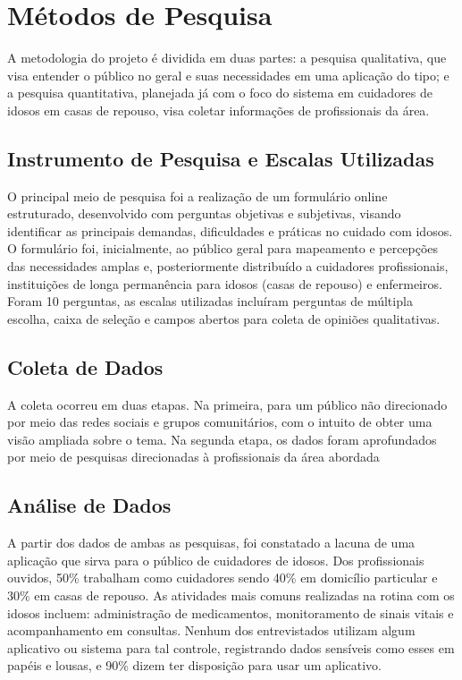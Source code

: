 \documentclass[
	article,			%
	12pt,				%
	oneside,			%
	a4paper,			%
    BIBLATEX,           %
	english,			%
	brazil,				%
	sumario=tradicional
	]{abntex2}
\begin{document}
\section{Métodos de Pesquisa}

A metodologia do projeto é dividida em duas partes: a pesquisa qualitativa, que visa entender o público no geral e suas necessidades em uma aplicação do tipo; e a pesquisa quantitativa, planejada já com o foco do sistema em cuidadores de idosos em casas de repouso, visa coletar informações de profissionais da área. 


\subsection{Instrumento de Pesquisa e Escalas Utilizadas}

O principal meio de pesquisa foi a realização de um formulário online estruturado, desenvolvido com perguntas objetivas e subjetivas, visando identificar as principais demandas, dificuldades e práticas no cuidado com idosos. O formulário foi, inicialmente, ao público geral para mapeamento e percepções das necessidades amplas e, posteriormente distribuído a cuidadores profissionais, instituições de longa permanência para idosos (casas de repouso) e enfermeiros. Foram 10 perguntas, as escalas utilizadas incluíram perguntas de múltipla escolha, caixa de seleção e campos abertos para coleta de opiniões qualitativas. 

\subsection{Coleta de Dados}

A coleta ocorreu em duas etapas. Na primeira, para um público não direcionado por meio das redes sociais e grupos comunitários, com o intuito de obter uma visão ampliada sobre o tema. Na segunda etapa, os dados foram aprofundados por meio de pesquisas direcionadas à profissionais da área abordada

\subsection{Análise de Dados}

A partir dos dados de ambas as pesquisas, foi constatado a lacuna de uma aplicação que sirva para o público de cuidadores de idosos. Dos profissionais ouvidos, 50\% trabalham como cuidadores sendo 40\% em domicílio particular e 30\% em casas de repouso. As atividades mais comuns realizadas na rotina com os idosos incluem: administração de medicamentos, monitoramento de sinais vitais e acompanhamento em consultas. Nenhum dos entrevistados utilizam algum aplicativo ou sistema para tal controle, registrando dados sensíveis como esses em papéis e lousas, e 90\% dizem ter disposição para usar um aplicativo. 
\end{document}
